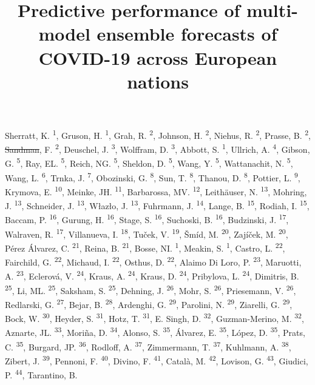 \documentclass[
]{article}
\title{Predictive performance of multi-model ensemble forecasts of COVID-19 across European nations}
\author{}
\date{\vspace{-2.5em}}
\providecommand{\DIFaddtex}[1]{{\protect\color{blue}\uwave{#1}}} %
\providecommand{\DIFdeltex}[1]{{\protect\color{red}\sout{#1}}}                      %
\providecommand{\DIFaddbegin}{} %
\providecommand{\DIFaddend}{} %
\providecommand{\DIFdelbegin}{} %
\providecommand{\DIFdelend}{} %
\providecommand{\DIFadd}[1]{\texorpdfstring{\DIFaddtex{#1}}{#1}} %
\providecommand{\DIFdel}[1]{\texorpdfstring{\DIFdeltex{#1}}{}} %
\newcommand{\DIFscaledelfig}{0.5}
\newlength{\DIFdelgraphicswidth} %
\newlength{\DIFdelgraphicsheight} %
\newcommand{\DIFaddincludegraphics}[2][]{{\color{blue}\fbox{\DIFOincludegraphics[#1]{#2}}}} %
\newcommand{\DIFdelincludegraphics}[2][]{%
\sbox{\DIFdelgraphicsbox}{\DIFOincludegraphics[#1]{#2}}%
\settoboxwidth{\DIFdelgraphicswidth}{\DIFdelgraphicsbox} %
\settoboxtotalheight{\DIFdelgraphicsheight}{\DIFdelgraphicsbox} %
\scalebox{\DIFscaledelfig}{%
\parbox[b]{\DIFdelgraphicswidth}{\usebox{\DIFdelgraphicsbox}\\[-\baselineskip] \rule{\DIFdelgraphicswidth}{0em}}\llap{\resizebox{\DIFdelgraphicswidth}{\DIFdelgraphicsheight}{%
\setlength{\unitlength}{\DIFdelgraphicswidth}%
\begin{picture}(1,1)%
\thicklines\linethickness{2pt} %
{\color[rgb]{1,0,0}\put(0,0){\framebox(1,1){}}}%
{\color[rgb]{1,0,0}\put(0,0){\line( 1,1){1}}}%
{\color[rgb]{1,0,0}\put(0,1){\line(1,-1){1}}}%
\end{picture}%
}\hspace*{3pt}}} %
} %
\DeclareRobustCommand{\DIFaddbegin}{\DIFOaddbegin \let\includegraphics\DIFaddincludegraphics} %
\DeclareRobustCommand{\DIFaddend}{\DIFOaddend \let\includegraphics\DIFOincludegraphics} %
\DeclareRobustCommand{\DIFdelbegin}{\DIFOdelbegin \let\includegraphics\DIFdelincludegraphics} %
\DeclareRobustCommand{\DIFdelend}{\DIFOaddend \let\includegraphics\DIFOincludegraphics} %
\begin{document}
\maketitle

Sherratt, K. \textsuperscript{1}, Gruson, H. \textsuperscript{1}, Grah, R. \textsuperscript{2}, Johnson, H. \textsuperscript{2}, Niehus, R. \textsuperscript{2}, Prasse, B. \textsuperscript{2}, \DIFdelbegin \DIFdel{Sandman}\DIFdelend \DIFaddbegin \DIFadd{Sandmann}\DIFaddend , F. \textsuperscript{2}, Deuschel, J. \textsuperscript{3}, Wolffram, D. \textsuperscript{3}, Abbott, S. \textsuperscript{1}, Ullrich, A. \textsuperscript{4}, Gibson, G. \textsuperscript{5}, Ray, EL. \textsuperscript{5}, Reich, NG. \textsuperscript{5}, Sheldon, D. \textsuperscript{5}, Wang, Y. \textsuperscript{5}, Wattanachit, N. \textsuperscript{5}, Wang, L. \textsuperscript{6}, Trnka, J. \textsuperscript{7}, Obozinski, G. \textsuperscript{8}, Sun, T. \textsuperscript{8}, Thanou, D. \textsuperscript{8}, Pottier, L. \textsuperscript{9}, Krymova, E. \textsuperscript{10}, Meinke, JH. \textsuperscript{11}, Barbarossa, MV. \textsuperscript{12}, Leithäuser, N. \textsuperscript{13}, Mohring, J. \textsuperscript{13}, Schneider, J. \textsuperscript{13}, Włazło, J. \textsuperscript{13}, Fuhrmann, J. \textsuperscript{14}, Lange, B. \textsuperscript{15}, Rodiah, I. \textsuperscript{15}, Baccam, P. \textsuperscript{16}, Gurung, H. \textsuperscript{16}, Stage, S. \textsuperscript{16}, Suchoski, B. \textsuperscript{16}, Budzinski, J. \textsuperscript{17}, Walraven, R. \textsuperscript{17}, Villanueva, I. \textsuperscript{18}, Tuček, V. \textsuperscript{19}, Šmíd, M. \textsuperscript{20}, Zajíček, M. \textsuperscript{20}, Pérez Álvarez, C. \textsuperscript{21}, Reina, B. \textsuperscript{21}, Bosse, NI. \textsuperscript{1}, Meakin, S. \textsuperscript{1}, Castro, L. \textsuperscript{22}, Fairchild, G. \textsuperscript{22}, Michaud, I. \textsuperscript{22}, Osthus, D. \textsuperscript{22}, Alaimo Di Loro, P. \textsuperscript{23}, Maruotti, A. \textsuperscript{23}, Eclerová, V. \textsuperscript{24}, Kraus, A. \textsuperscript{24}, Kraus, D. \textsuperscript{24}, Pribylova, L. \textsuperscript{24}, Dimitris, B. \textsuperscript{25}, Li, ML. \textsuperscript{25}, Saksham, S. \textsuperscript{25}, Dehning, J. \textsuperscript{26}, Mohr, S. \textsuperscript{26}, Priesemann, V. \textsuperscript{26}, Redlarski, G. \textsuperscript{27}, Bejar, B. \textsuperscript{28}, Ardenghi, G. \textsuperscript{29}, Parolini, N. \textsuperscript{29}, Ziarelli, G. \textsuperscript{29}, Bock, W. \textsuperscript{30}, Heyder, S. \textsuperscript{31}, Hotz, T. \textsuperscript{31}, E. Singh, D. \textsuperscript{32}, Guzman-Merino, M. \textsuperscript{32}, Aznarte, JL. \textsuperscript{33}, Moriña, D. \textsuperscript{34}, Alonso, S. \textsuperscript{35}, Álvarez, E. \textsuperscript{35}, López, D. \textsuperscript{35}, Prats, C. \textsuperscript{35}, Burgard, JP. \textsuperscript{36}, Rodloff, A. \textsuperscript{37}, Zimmermann, T. \textsuperscript{37}, Kuhlmann, A. \textsuperscript{38}, Zibert, J. \textsuperscript{39}, Pennoni, F. \textsuperscript{40}, Divino, F. \textsuperscript{41}, Català, M. \textsuperscript{42}, Lovison, G. \textsuperscript{43}, Giudici, P. \textsuperscript{44}, Tarantino, B. 
\end{document}
